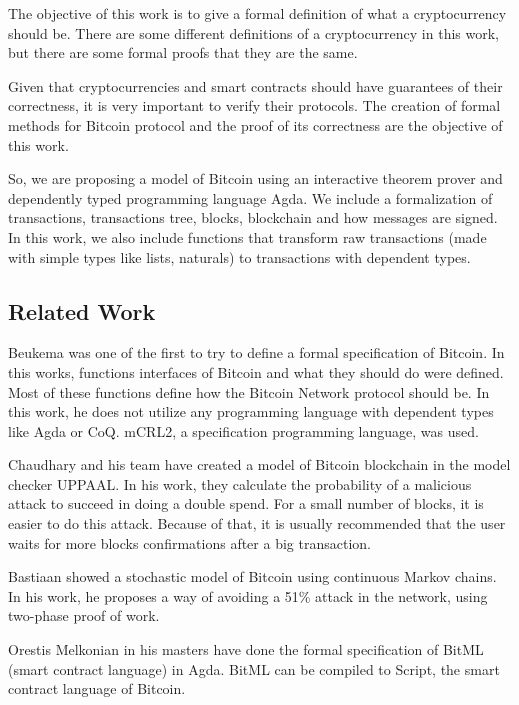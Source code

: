 The objective of this work is to give a formal definition of what a cryptocurrency should be.
There are some different definitions of a cryptocurrency in this work,
but there are some formal proofs that they are the same.

Given that cryptocurrencies and smart contracts should have guarantees of their correctness,
it is very important to verify their protocols.
The creation of formal methods for Bitcoin protocol and the proof of its correctness are
the objective of this work.

So, we are proposing a model of Bitcoin using an interactive theorem prover and dependently
typed programming language Agda.
We include a formalization of transactions, transactions tree, blocks, blockchain and
how messages are signed.
In this work, we also include functions that transform raw transactions (made with simple types like
lists, naturals) to transactions with dependent types.

\subsection{Related Work}

Beukema \cite{beukema2014formalising} was one of the first to try
to define a formal specification of Bitcoin.
In this works, functions interfaces of Bitcoin and what they should do were defined.
Most of these functions define how the Bitcoin Network protocol should be.
In this work, he does not utilize any programming language with dependent types like Agda or CoQ.
mCRL2, a specification programming language, was used.

Chaudhary and his team \cite{chaudhary2015modeling} have created a model of Bitcoin blockchain
in the model checker UPPAAL.
In his work, they calculate the probability of a malicious attack to succeed in doing a double spend.
For a small number of blocks, it is easier to do this attack.
Because of that, it is usually recommended that the user waits for more blocks confirmations
after a big transaction.

Bastiaan \cite{bastiaan2015preventing} showed a stochastic model of Bitcoin using
continuous Markov chains.
In his work, he proposes a way of avoiding a 51\% attack in the network,
using two-phase proof of work.

Orestis Melkonian \cite{melkonian2019formalizing} in his masters have done the formal specification
of BitML (smart contract language) in Agda.
BitML can be compiled to Script, the smart contract language of Bitcoin. 

